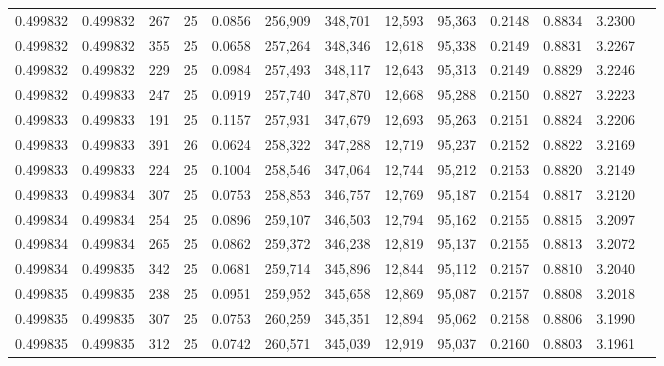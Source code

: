 \begin{tabular}{rrrrrrrrrrrrr}
0.499832 & 0.499832 &   267 &  25 &                                     0.0856 & 256,909 & 348,701 &  12,593 &  95,363 & 0.2148 & 0.8834 & 3.2300 \\
0.499832 & 0.499832 &   355 &  25 &                                     0.0658 & 257,264 & 348,346 &  12,618 &  95,338 & 0.2149 & 0.8831 & 3.2267 \\
0.499832 & 0.499832 &   229 &  25 &                                     0.0984 & 257,493 & 348,117 &  12,643 &  95,313 & 0.2149 & 0.8829 & 3.2246 \\
0.499832 & 0.499833 &   247 &  25 &                                     0.0919 & 257,740 & 347,870 &  12,668 &  95,288 & 0.2150 & 0.8827 & 3.2223 \\
0.499833 & 0.499833 &   191 &  25 &                                     0.1157 & 257,931 & 347,679 &  12,693 &  95,263 & 0.2151 & 0.8824 & 3.2206 \\
0.499833 & 0.499833 &   391 &  26 &                                     0.0624 & 258,322 & 347,288 &  12,719 &  95,237 & 0.2152 & 0.8822 & 3.2169 \\
0.499833 & 0.499833 &   224 &  25 &                                     0.1004 & 258,546 & 347,064 &  12,744 &  95,212 & 0.2153 & 0.8820 & 3.2149 \\
0.499833 & 0.499834 &   307 &  25 &                                     0.0753 & 258,853 & 346,757 &  12,769 &  95,187 & 0.2154 & 0.8817 & 3.2120 \\
0.499834 & 0.499834 &   254 &  25 &                                     0.0896 & 259,107 & 346,503 &  12,794 &  95,162 & 0.2155 & 0.8815 & 3.2097 \\
0.499834 & 0.499834 &   265 &  25 &                                     0.0862 & 259,372 & 346,238 &  12,819 &  95,137 & 0.2155 & 0.8813 & 3.2072 \\
0.499834 & 0.499835 &   342 &  25 &                                     0.0681 & 259,714 & 345,896 &  12,844 &  95,112 & 0.2157 & 0.8810 & 3.2040 \\
0.499835 & 0.499835 &   238 &  25 &                                     0.0951 & 259,952 & 345,658 &  12,869 &  95,087 & 0.2157 & 0.8808 & 3.2018 \\
0.499835 & 0.499835 &   307 &  25 &                                     0.0753 & 260,259 & 345,351 &  12,894 &  95,062 & 0.2158 & 0.8806 & 3.1990 \\
0.499835 & 0.499835 &   312 &  25 &                                     0.0742 & 260,571 & 345,039 &  12,919 &  95,037 & 0.2160 & 0.8803 & 3.1961 \\

\end{tabular}
